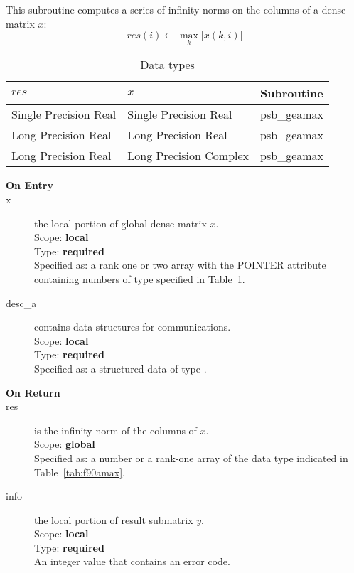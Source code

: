 
This subroutine computes a series of  infinity norms on the columns of
a  dense matrix  $x$: 
\[ res(i) \leftarrow \max_k |x(k,i)| \]

\begin{table}[h]
\begin{center}
\begin{tabular}{lll}
\hline
$res$&  $x$& {\bf Subroutine}\\
\hline
Single Precision Real  &Single Precision Real  & psb\_geamax\\
Long Precision Real    &Long Precision Real    & psb\_geamax\\
Long Precision Real &Long Precision Complex & psb\_geamax\\	
\hline
\end{tabular}
\end{center}
\caption{Data types\label{tab:f90mamax}}
\end{table}

\begin{description}
\item[\bf On Entry]
\item[x] the local portion of global dense matrix
$x$. \\
Scope: {\bf local} \\
Type: {\bf required} \\
Specified as: a rank one or two array with the POINTER attribute
containing numbers of type specified in
Table~\ref{tab:f90mamax}. 
\item[desc\_a] contains data structures for communications.\\
Scope: {\bf local} \\
Type: {\bf required}\\
Specified as: a structured data of type \descdata.
\item[\bf On Return] 
\item[res] is the infinity norm of the columns of $x$.\\
Scope: {\bf global} \\
Specified as: a number or a rank-one array  of the data type indicated
in Table~\ref{tab:f90amax}. 
\item[info] the local portion of result submatrix $y$.\\
Scope: {\bf local} \\
Type: {\bf required} \\
An integer value that contains an error code. 
\end{description}

